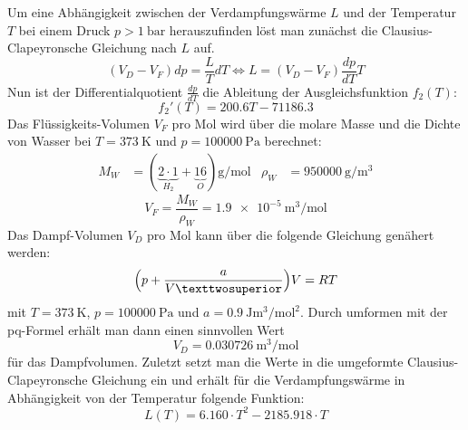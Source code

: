 Um eine Abhängigkeit zwischen der Verdampfungswärme $L$ und der Temperatur
$T$ bei einem Druck $p > \SI{1}{\bar}$ herauszufinden löst man zunächst die
Clausius-Clapeyronsche Gleichung nach $L$ auf.
\begin{equation}
  (V_D - V_F) dp = \frac{L}{T} dT
  \iff L = (V_D - V_F) \frac{dp}{dT} T
\end{equation}
Nun ist der Differentialquotient $\frac{dp}{dT}$ die Ableitung der
Ausgleichsfunktion $f_2(T)$:
\begin{equation}
  f_2'(T) = 200.6 T - 71186.3
\end{equation}
Das Flüssigkeits-Volumen $V_F$ pro Mol wird über die molare Masse und die
Dichte von Wasser\cite{stoffwerte} bei $T = \SI{373}{\kelvin}$ und
$p = \SI{100000}{\Pa}$ berechnet:
\begin{align}
  M_W & = (\underbrace{2 \cdot 1}_{H_2} + \underbrace{16}_{O})
  \si{\gram\per\mol} & \rho_W & = \SI{950000}{\gram\per\cubic\meter}
\end{align}
\begin{equation}
  V_F = \frac{M_W}{\rho_W} = \SI{1.9 e-5}{\cubic\meter\per\mol}
\end{equation}
Das Dampf-Volumen $V_D$ pro Mol kann über die folgende Gleichung genähert
werden:
\begin{equation}
  \Bigl(p + \frac{a}{V²}\Bigr)V = R T
\end{equation} mit $T = \SI{373}{\kelvin}$, $p = \SI{100000}{\Pa}$ und
$a = \SI{0.9}{\joule\cubic\meter\per\mol\squared}$.
Durch umformen mit der
pq-Formel erhält man dann einen sinnvollen Wert
\begin{equation}
  V_D = \SI{0.030726}{\cubic\meter\per\mol}
\end{equation} für das Dampfvolumen.
Zuletzt setzt man die Werte in die umgeformte
Clausius-Clapeyronsche Gleichung ein und erhält für die Verdampfungswärme in
Abhängigkeit von der Temperatur folgende Funktion:
\begin{equation}
  L(T) = 6.160 \cdot T^2 - 2185.918 \cdot T
\end{equation}

\newpage

